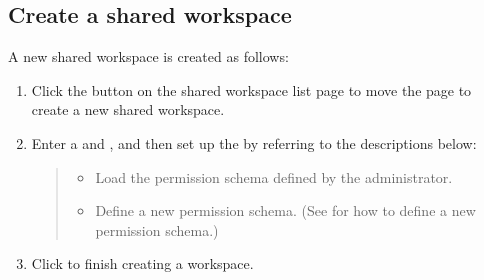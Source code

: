\documentclass[letterpaper,10pt,english]{sphinxmanual}
\begin{document}
\subsection{Create a shared workspace}
\label{\detokenize{discovery/part03/shared_workspace:shared-workspace-creation}}\label{\detokenize{discovery/part03/shared_workspace:id3}}
A new shared workspace is created as follows:
\begin{enumerate}
\def\theenumi{\arabic{enumi}}
\def\labelenumi{\theenumi .}
\makeatletter\def\p@enumii{\p@enumi \theenumi .}\makeatother
\item {} 
Click the  button on the shared workspace list page to move the page to create a new shared workspace.

\item {} 
Enter a  and , and then set up the  by referring to the descriptions below:
\begin{quote}

\begin{figure}[H]
\centering

\noindent{}
\end{figure}
\begin{itemize}
\item {} 
 Load the permission schema defined by the administrator.

\item {} 
 Define a new permission schema. (See {\hyperref[\detokenize{discovery/part03/shared_workspace:shared-workspace-permission}]{}} for how to define a new permission schema.)

\end{itemize}
\end{quote}

\item {} 
Click  to finish creating a workspace.

\end{enumerate}
\end{document}
